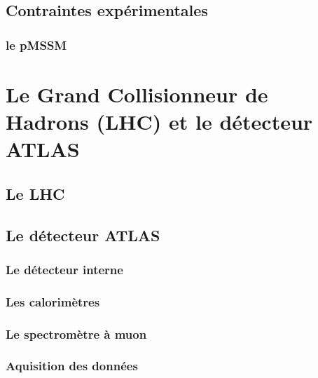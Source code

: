 \documentclass[12pt,canadien]{article}
\begin{document}
\subsection{Contraintes expérimentales}
\label{sec:susy:contraintes}

\subsubsection{le pMSSM}
\label{sec:susy:contraintes:pmssm}



\singlespacing{}
\section{Le Grand Collisionneur de Hadrons (LHC) et le détecteur
  ATLAS}
\label{sec:lhc_atlas}
\doublespacing{}

\subsection{Le LHC}
\label{sec:lhc_atlas:lhc}

\subsection{Le détecteur ATLAS}
\label{sec:lhc_atlas:atlas}

\subsubsection{Le détecteur interne}
\label{sec:lhc_atlas:atlas:indet}

\subsubsection{Les calorimètres}
\label{sec:lhc_atlas:atlas:calo}

\subsubsection{Le spectromètre à muon}
\label{sec:lhc_atlas:atlas:mu}

\subsubsection{Aquisition des données}
\label{sec:lhc_atlas:atlas:daq}

\end{document}
